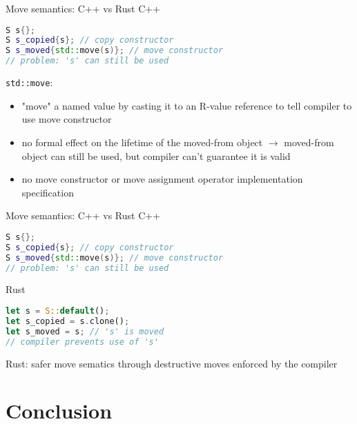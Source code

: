 \documentclass[handout]{beamer}
\begin{document}
\begin{frame}[fragile]{Move semantics: C++ vs Rust}
C++
\begin{lstlisting}[language=C++]
S s{};
S s_copied{s}; // copy constructor
S s_moved{std::move(s)}; // move constructor
// problem: 's' can still be used
\end{lstlisting}

\verb|std::move|:
\begin{itemize}
  \item "move" a named value by casting it to an R-value reference to tell compiler to use move constructor
  \item no formal effect on the lifetime of the moved-from object $\rightarrow$ moved-from object can still be used, but compiler can't guarantee it is valid
  \item no move constructor or move assignment operator implementation specification
\end{itemize}
\end{frame}


\begin{frame}[fragile]{Move semantics: C++ vs Rust}
C++
\begin{lstlisting}[language=C++]
S s{};
S s_copied{s}; // copy constructor
S s_moved{std::move(s)}; // move constructor
// problem: 's' can still be used
\end{lstlisting}

Rust
\begin{lstlisting}[language=Rust]
let s = S::default();
let s_copied = s.clone();
let s_moved = s; // 's' is moved
// compiler prevents use of 's'
\end{lstlisting}

Rust: safer move sematics through destructive moves enforced by the compiler
\end{frame}


\section{Conclusion}
\end{document}
